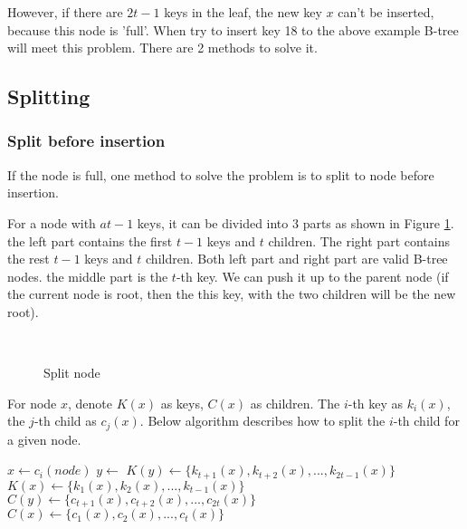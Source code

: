 \documentclass[UTF8]{article}
\begin{document}
However, if there are $2t-1$ keys in the leaf, the new key $x$ can't
be inserted, because this node is 'full'. When try to insert key 18
to the above example B-tree will meet this problem. There are 2 methods to
solve it.

\subsection{Splitting}
\label{split}

\subsubsection{Split before insertion}

If the node is full, one method to solve the problem is to
split to node before insertion.

For a node with $at-1$ keys, it can be divided into 3 parts as shown in
Figure \ref{fig:node-split}. the left part contains the first $t-1$ keys
and $t$ children. The right part contains the rest $t-1$ keys
and $t$ children. Both left part and right part are valid B-tree
nodes. the middle part is the $t$-th key. We can push it up
to the parent node (if the current node is root, then the this key,
with the two children will be the new root).

\begin{figure}[htbp]
  \centering
   \\
  \caption{Split node}
  \label{fig:node-split}
\end{figure}

For node $x$, denote $K(x)$
as keys, $C(x)$ as children. The $i$-th key as $k_i(x)$, the $j$-th child
as $c_j(x)$. Below algorithm describes how to split the $i$-th child for a given node.

\begin{algorithmic}[1]
  \State $x \gets c_i(node)$
  \State $y \gets$ 
  \State {}
  \State {}
  \State $K(y) \gets \{k_{t+1}(x), k_{t+2}(x), ..., k_{2t-1}(x)\}$
  \State $K(x) \gets \{k_1(x), k_2(x), ..., k_{t-1}(x)\}$
    \State $C(y) \gets \{c_{t+1}(x), c_{t+2}(x), ..., c_{2t}(x)\}$
    \State $C(x) \gets \{c_1(x), c_2(x), ..., c_t(x)\}$
  \EndIf
\EndProcedure
\end{algorithmic}
\end{document}
